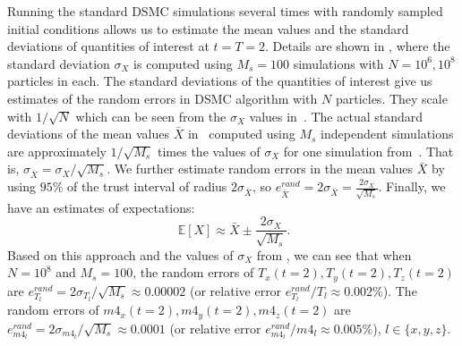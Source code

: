 \documentclass[times,final,nopreprintline]{elsarticle}
\begin{document}
 
Running the standard DSMC simulations several times with randomly sampled initial conditions allows us to estimate the mean values and the standard deviations of quantities of interest at $t=T=2$. Details are shown in , where the standard deviation $\sigma_X$ is computed using $M_s=100$ simulations with $N=10^6, 10^8$ particles in each.
The standard deviations of the quantities of interest give us estimates of the random errors in DSMC algorithm with $N$ particles. They scale with $1/\sqrt{N}$ which can be seen from the $\sigma_X$ values in~. The actual standard deviations of the mean values $\bar{X}$ in~ computed using $M_s$ independent simulations are approximately $1/\sqrt{M_s}$ times the values of $\sigma_X$ for one simulation from~. That is, $\sigma_{\bar{X}} = {\sigma_X}/  {\sqrt{M_s}}$. We further estimate random errors in the mean values $\bar{X}$ by using $95\%$ of the trust interval of radius $2\sigma_{\bar{X}}$, so $e^{rand}_{\bar{X}}=2\sigma_{\bar{X}}=\frac{2 \sigma_X}{\sqrt{M_s}}$. Finally, we have an estimates of expectations:
\begin{equation}~\label{eq:E[X]approx}
\mathbb E [X] \approx  \bar{X}  \pm \frac{2 \sigma_X}{\sqrt{M_s}}. 
\end{equation}
Based on this approach and the values of $\sigma_X$ from , we can see that when $N=10^8$ and $M_s=100$, the random errors of $T_x(t=2), T_y(t=2), T_z(t=2)$ are $e^{rand}_{T_l} = 2 \sigma_{T_l}/\sqrt{M_s} \approx 0.00002$ (or relative error $e^{rand}_{T_l}/T_l \approx 0.002\% $). The random errors of $m4_x(t=2), m4_y(t=2), m4_z(t=2)$ are $e^{rand}_{m4_l} =2 \sigma_{m4_l}/\sqrt{M_s} \approx 0.0001$ (or relative error $e^{rand}_{m4_l}/m4_l \approx 0.005\% $), $l\in\{x,y,z\}$.
\end{document}
